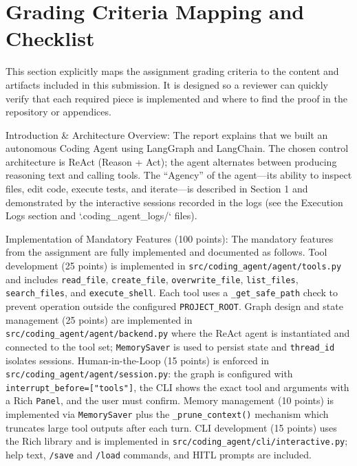 \documentclass[12pt, a4paper]{article}
\begin{document}
\newpage
\section{Grading Criteria Mapping and Checklist}
This section explicitly maps the assignment grading criteria to the content and artifacts included in this submission. It is designed so a reviewer can quickly verify that each required piece is implemented and where to find the proof in the repository or appendices.

Introduction \& Architecture Overview: The report explains that we built an autonomous Coding Agent using LangGraph and LangChain. The chosen control architecture is ReAct (Reason + Act); the agent alternates between producing reasoning text and calling tools. The “Agency” of the agent—its ability to inspect files, edit code, execute tests, and iterate—is described in Section 1 and demonstrated by the interactive sessions recorded in the logs (see the Execution Logs section and `.coding_agent_logs/` files).

Implementation of Mandatory Features (100 points): The mandatory features from the assignment are fully implemented and documented as follows. Tool development (25 points) is implemented in \texttt{src/coding\_agent/agent/tools.py} and includes \texttt{read\_file}, \texttt{create\_file}, \texttt{overwrite\_file}, \texttt{list\_files}, \texttt{search\_files}, and \texttt{execute\_shell}. Each tool uses a \texttt{\_get\_safe\_path} check to prevent operation outside the configured \texttt{PROJECT\_ROOT}. Graph design and state management (25 points) are implemented in \texttt{src/coding\_agent/agent/backend.py} where the ReAct agent is instantiated and connected to the tool set; \texttt{MemorySaver} is used to persist state and \texttt{thread\_id} isolates sessions. Human-in-the-Loop (15 points) is enforced in \texttt{src/coding\_agent/agent/session.py}: the graph is configured with \texttt{interrupt\_before=["tools"]}, the CLI shows the exact tool and arguments with a Rich \texttt{Panel}, and the user must confirm. Memory management (10 points) is implemented via \texttt{MemorySaver} plus the \texttt{\_prune\_context()} mechanism which truncates large tool outputs after each turn. CLI development (15 points) uses the Rich library and is implemented in \texttt{src/coding\_agent/cli/interactive.py}; help text, \texttt{/save} and \texttt{/load} commands, and HITL prompts are included.
\end{document}
